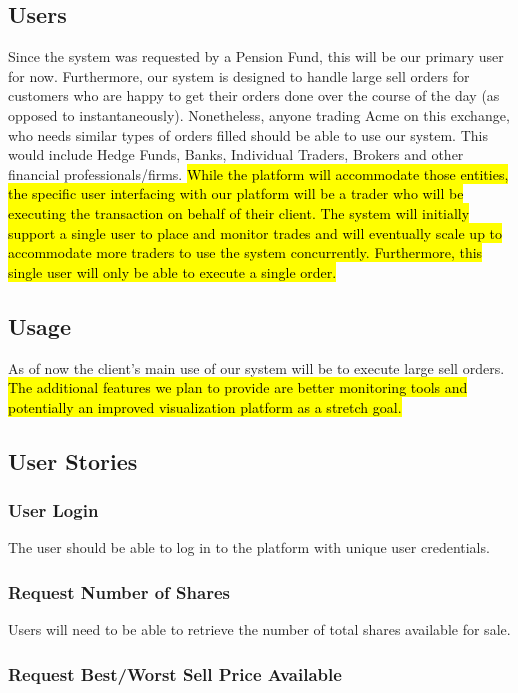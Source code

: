 \documentclass{article}
\begin{document}
\subsection{Users}
Since the system was requested by a Pension Fund, this will be our primary user for now. Furthermore, our system is designed to handle large sell orders for customers who are happy to get their orders done over the course of the day (as opposed to instantaneously). Nonetheless, anyone trading Acme on this exchange, who needs similar types of orders filled should be able to use our system. This would include Hedge Funds, Banks, Individual Traders, Brokers and other financial professionals/firms. \hl{While the platform will accommodate those entities, the specific user interfacing with our platform will be a trader who will be executing the transaction on behalf of their client.  The system will initially support a single user to place and monitor trades and will eventually scale up to accommodate more traders to use the system concurrently. Furthermore, this single user will only be able to execute a single order.}

\subsection{Usage}
As of now the client's main use of our system will be to execute large sell orders. \hl{The additional features we plan to provide are better monitoring tools and potentially an improved visualization platform as a stretch goal.}

\pagebreak
\subsection{User Stories}

\subsubsection{User Login}

The user should be able to log in to the platform with unique user credentials.

\subsubsection{Request Number of Shares}

Users will need to be able to retrieve the number of total shares available for sale.

\subsubsection{Request Best/Worst Sell Price Available}
\end{document}
